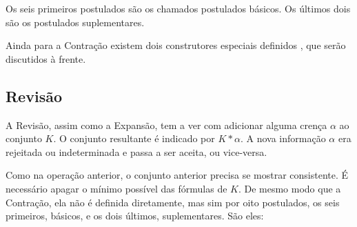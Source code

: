 Os seis primeiros postulados são os chamados postulados básicos. Os últimos dois são os postulados suplementares.

Ainda para a Contração existem dois construtores especiais definidos \cite{logicaMatos}, que serão discutidos à frente.

\subsection{Revisão}

A Revisão, assim como a Expansão, tem a ver com adicionar alguma crença $ \alpha $ ao conjunto $ K $. O conjunto resultante é indicado por $ K \ast \alpha $. A nova informação $ \alpha $ era rejeitada ou indeterminada e passa a ser aceita, ou vice-versa.

Como na operação anterior, o conjunto anterior precisa se mostrar consistente. É necessário apagar o mínimo possível das fórmulas de $ K $. De mesmo modo que a Contração, ela não é definida diretamente, mas sim por oito postulados, os seis primeiros, básicos, e os dois últimos, suplementares. São eles:


